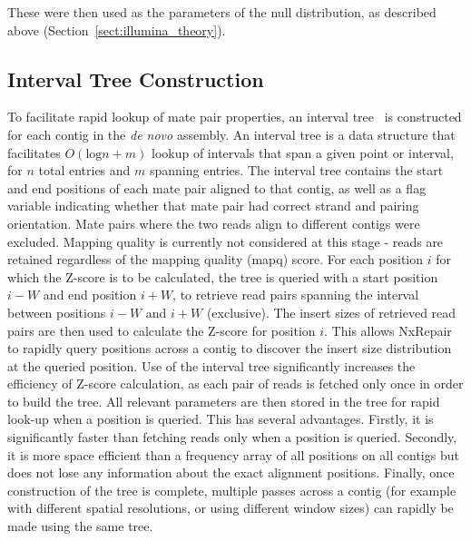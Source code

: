 These were then used as the parameters of the null distribution, as described above (Section~\ref{sect:illumina_theory}).

\subsection{Interval Tree Construction}
To facilitate rapid lookup of mate pair properties, an interval tree~\cite{cormen2009} is constructed for each contig in the \textit{de novo} assembly. An interval tree is a data structure that facilitates $O(\text{log} n + m)$ lookup of intervals that span a given point or interval, for $n$ total entries and $m$ spanning entries. The interval tree contains the start and end positions of each mate pair aligned to that contig, as well as a flag variable indicating whether that mate pair had correct strand and pairing orientation. Mate pairs where the two reads align to different contigs were excluded. Mapping quality is currently not considered at this stage - reads are retained regardless of the mapping quality (mapq) score. For each position $i$ for which the Z-score is to be calculated, the tree is queried with a start position $i-W$ and end position $i+W$, to retrieve read pairs spanning the interval between positions $i-W$ and $i+W$ (exclusive). The insert sizes of retrieved read pairs are then used to calculate the Z-score for position $i$. This allows NxRepair to rapidly query positions across a contig to discover the insert size distribution at the queried position. Use of the interval tree significantly increases the efficiency of Z-score calculation, as each pair of reads is fetched only once in order to build the tree. All relevant parameters are then stored in the tree for rapid look-up when a position is queried. This has several advantages. Firstly, it is significantly faster than fetching reads only when a position is queried. Secondly, it is more space efficient than a frequency array of all positions on all contigs but does not lose any information about the exact alignment positions. Finally, once construction of the tree is complete, multiple passes across a contig (for example with different spatial resolutions, or using different window sizes) can rapidly be made using the same tree.      


